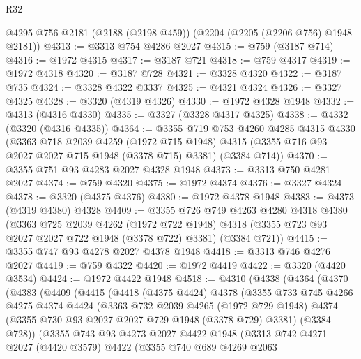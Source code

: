 \begin{lexlean}{R32}
\begin{coremodule}
    @4295
    @756
    @2181
    (@2188 (@2198 @459))
    (@2204 (@2205 (@2206 @756) @1948 @2181))
@4313 := @3313 @754 @4286 @2027
@4315 := @759 (@3187 @714)
@4316 := @1972 @4315
@4317 := @3187 @721
@4318 := @759 @4317
@4319 := @1972 @4318
@4320 := @3187 @728
@4321 := @3328 @4320
@4322 := @3187 @735
@4324 := @3328 @4322 @3337
@4325 := @4321 @4324
@4326 := @3327 @4325
@4328 := @3320 (@4319 @4326)
@4330 := @1972 @4328 @1948
@4332 := @4313 (@4316 @4330)
@4335 := @3327 (@3328 @4317 @4325)
@4338 := @4332 (@3320 (@4316 @4335))
@4364 := @3355
    @719
    @753
    @4260
    @4285
    @4315
    @4330
    (@3363
      @718
      @2039
      @4259
      (@1972 @715 @1948)
      @4315
      (@3355 @716 @93 @2027 @2027 @715 @1948 (@3378 @715) @3381)
      (@3384 @714))
@4370 := @3355 @751 @93 @4283 @2027 @4328 @1948
@4373 := @3313 @750 @4281 @2027
@4374 := @759 @4320
@4375 := @1972 @4374
@4376 := @3327 @4324
@4378 := @3320 (@4375 @4376)
@4380 := @1972 @4378 @1948
@4383 := @4373 (@4319 @4380) @4328
@4409 := @3355
    @726
    @749
    @4263
    @4280
    @4318
    @4380
    (@3363
      @725
      @2039
      @4262
      (@1972 @722 @1948)
      @4318
      (@3355 @723 @93 @2027 @2027 @722 @1948 (@3378 @722) @3381)
      (@3384 @721))
@4415 := @3355 @747 @93 @4278 @2027 @4378 @1948
@4418 := @3313 @746 @4276 @2027
@4419 := @759 @4322
@4420 := @1972 @4419
@4422 := @3320 (@4420 @3534)
@4424 := @1972 @4422 @1948
@4518 := @4310
    (@4338
      (@4364
        (@4370
          (@4383
            (@4409
              (@4415
                (@4418
                  (@4375 @4424)
                  @4378
                  (@3355
                    @733
                    @745
                    @4266
                    @4275
                    @4374
                    @4424
                    (@3363
                      @732
                      @2039
                      @4265
                      (@1972 @729 @1948)
                      @4374
                      (@3355 @730 @93 @2027 @2027 @729 @1948 (@3378 @729) @3381)
                      (@3384 @728))
                    (@3355
                      @743
                      @93
                      @4273
                      @2027
                      @4422
                      @1948
                      (@3313
                        @742
                        @4271
                        @2027
                        (@4420 @3579)
                        @4422
                        (@3355
                          @740
                          @689
                          @4269
                          @2063

\end{coremodule}
\end{lexlean}
